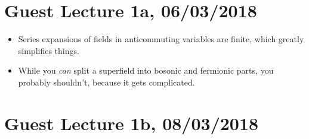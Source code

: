 \section*{Guest Lecture 1a, 06/03/2018}
\begin{itemize}
    \item Series expansions of fields in anticommuting variables are finite, which greatly simplifies things.
    \item While you \emph{can} split a superfield into bosonic and fermionic parts, you probably shouldn't, because it gets complicated. 
\end{itemize}
\section*{Guest Lecture 1b, 08/03/2018}
